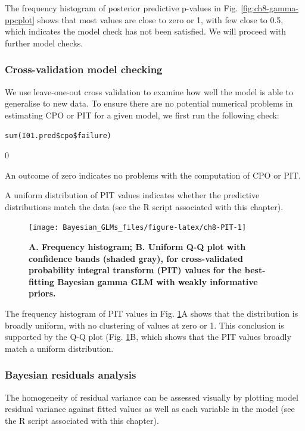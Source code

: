 \documentclass[
]{book}
\begin{document}
The frequency histogram of posterior predictive p-values in Fig. \ref{fig:ch8-gamma-ppcplot} shows that most values are close to zero or 1, with few close to 0.5, which indicates the model check has not been satisfied. We will proceed with further model checks.

\hypertarget{gamma-cv}{%
\subsubsection{Cross-validation model checking}\label{gamma-cv}}

We use leave-one-out cross validation to examine how well the model is able to generalise to new data. To ensure there are no potential numerical problems in estimating CPO or PIT for a given model, we first run the following check:

\texttt{sum(I01.pred\$cpo\$failure)}

0

An outcome of zero indicates no problems with the computation of CPO or PIT.

A uniform distribution of PIT values indicates whether the predictive distributions match the data (see the R script associated with this chapter).



\begin{figure}

{\centering \texttt{[image: Bayesian\_GLMs\_files/figure-latex/ch8-PIT-1]} 

}

\caption{\textbf{A. Frequency histogram; B. Uniform Q-Q plot with confidence bands (shaded gray), for cross-validated probability integral transform (PIT) values for the best-fitting Bayesian gamma GLM with weakly informative priors.}}\label{fig:ch8-PIT}
\end{figure}

The frequency histogram of PIT values in Fig. \ref{fig:ch8-PIT}A shows that the distribution is broadly uniform, with no clustering of values at zero or 1. This conclusion is supported by the Q-Q plot (Fig. \ref{fig:ch8-PIT}B, which shows that the PIT values broadly match a uniform distribution.

\hypertarget{gamma-resids}{%
\subsubsection{Bayesian residuals analysis}\label{gamma-resids}}

The homogeneity of residual variance can be assessed visually by plotting model residual variance against fitted values as well as each variable in the model (see the R script associated with this chapter).
\end{document}
